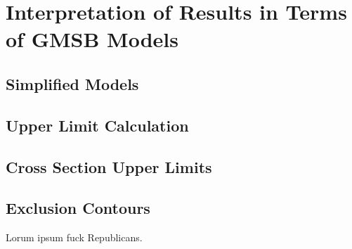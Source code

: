 \documentclass[dissertation.tex]{subfiles}
\begin{document}
\chapter{Interpretation of Results in Terms of GMSB Models}
\label{chap:Interpretation of Results in Terms of GMSB Models}

\section{Simplified Models}

\section{Upper Limit Calculation}

\section{Cross Section Upper Limits}

\section{Exclusion Contours}

Lorum ipsum fuck Republicans.
\end{document}
